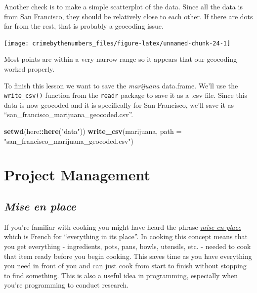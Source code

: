 \documentclass[
  12pt,
]{book}
\newenvironment{Shaded}{\begin{snugshade}}{\end{snugshade}}
\newcommand{\DataTypeTok}[1]{\textcolor[rgb]{0.27,0.27,0.27}{#1}}
\newcommand{\KeywordTok}[1]{\textcolor[rgb]{0.27,0.27,0.27}{\textbf{#1}}}
\newcommand{\NormalTok}[1]{#1}
\newcommand{\OperatorTok}[1]{\textcolor[rgb]{0.43,0.43,0.43}{\textbf{#1}}}
\newcommand{\StringTok}[1]{\textcolor[rgb]{0.5,0.5,0.5}{#1}}
\begin{document}
Another check is to make a simple scatterplot of the data. Since all the data is from San Francisco, they should be relatively close to each other. If there are dots far from the rest, that is probably a geocoding issue.

\begin{Shaded}
\end{Shaded}

\begin{center}\texttt{[image: crimebythenumbers\_files/figure-latex/unnamed-chunk-24-1]} \end{center}

Most points are within a very narrow range so it appears that our geocoding worked properly.

To finish this lesson we want to save the \emph{marijuana} data.frame. We'll use the \texttt{write\_csv()} function from the \texttt{readr} package to save it as a .csv file. Since this data is now geocoded and it is specifically for San Francisco, we'll save it as ``san\_francisco\_marijuana\_geocoded.csv''.

\begin{Shaded}
\begin{Highlighting}[]
\KeywordTok{setwd}\NormalTok{(here}\OperatorTok{::}\KeywordTok{here}\NormalTok{(}\StringTok{"data"}\NormalTok{))}
\KeywordTok{write\_csv}\NormalTok{(marijuana, }\DataTypeTok{path =} \StringTok{"san\_francisco\_marijuana\_geocoded.csv"}\NormalTok{)}
\end{Highlighting}
\end{Shaded}

\hypertarget{part-project-management}{%
\part{Project Management}\label{part-project-management}}

\hypertarget{mise-en-place}{%
\chapter{\texorpdfstring{\emph{Mise en place}}{Mise en place}}\label{mise-en-place}}

If you're familiar with cooking you might have heard the phrase \href{https://en.wikipedia.org/wiki/Mise_en_place}{\emph{mise en place}} which is French for ``everything in its place''. In cooking this concept means that you get everything - ingredients, pots, pans, bowls, utensils, etc. - needed to cook that item ready before you begin cooking. This saves time as you have everything you need in front of you and can just cook from start to finish without stopping to find something. This is also a useful idea in programming, especially when you're programming to conduct research.
\end{document}
